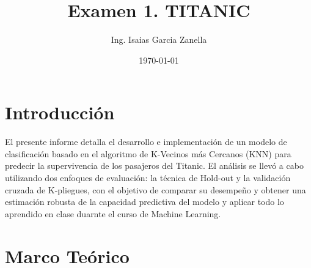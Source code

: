 \documentclass[12pt]{article}
\title{Examen 1. TITANIC }
\author{Ing. Isaias Garcia Zanella}
\date{\today}
\begin{document}
\maketitle

\section{Introducción}
El presente informe detalla el desarrollo e implementación de un modelo de clasificación basado en el algoritmo de K-Vecinos más Cercanos (KNN) para predecir la supervivencia de los pasajeros del Titanic. El análisis se llevó a cabo utilizando dos enfoques de evaluación: la técnica de Hold-out y la validación cruzada de K-pliegues, con el objetivo de comparar su desempeño y obtener una estimación robusta de la capacidad predictiva del modelo y aplicar 
todo lo aprendido en clase duarnte el curso de Machine Learning.

\section{Marco Teórico}


\end{document}
